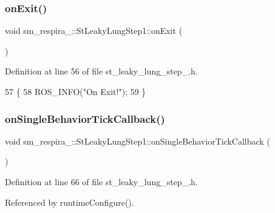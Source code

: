 \subsubsection{\texorpdfstring{on\+Exit()}{onExit()}}
{\footnotesize\ttfamily void sm\+\_\+respira\+\_\+::\+St\+Leaky\+Lung\+Step1\+::on\+Exit (\begin{DoxyParamCaption}{ }\end{DoxyParamCaption})\hspace{0.3cm}{\ttfamily [inline]}}



Definition at line 56 of file st\+\_\+leaky\+\_\+lung\+\_\+step\+\_.\+h.


\begin{DoxyCode}
57     \{
58         ROS\_INFO(\textcolor{stringliteral}{"On Exit!"});
59     \}
\end{DoxyCode}
\mbox{\label{structsm__respira__1_1_1StLeakyLungStep1_aa460e2eed62e5b958ee85ddc4904f776}} 
\subsubsection{\texorpdfstring{on\+Single\+Behavior\+Tick\+Callback()}{onSingleBehaviorTickCallback()}}
{\footnotesize\ttfamily void sm\+\_\+respira\+\_\+::\+St\+Leaky\+Lung\+Step1\+::on\+Single\+Behavior\+Tick\+Callback (\begin{DoxyParamCaption}{ }\end{DoxyParamCaption})\hspace{0.3cm}{\ttfamily [inline]}}



Definition at line 66 of file st\+\_\+leaky\+\_\+lung\+\_\+step\+\_.\+h.



Referenced by runtime\+Configure().


